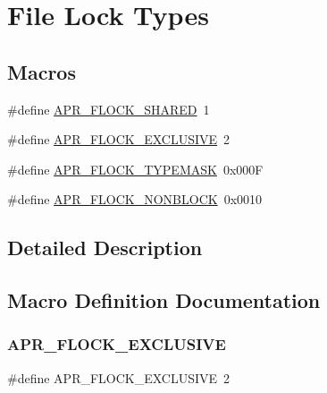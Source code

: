 \hypertarget{group__apr__file__lock__types}{}\section{File Lock Types}
\label{group__apr__file__lock__types}
\subsection*{Macros}
\begin{DoxyCompactItemize}
\item 
\#define \mbox{\hyperlink{group__apr__file__lock__types_gaba177fe81cd70b389753ad2096b2ce7c}{A\+P\+R\+\_\+\+F\+L\+O\+C\+K\+\_\+\+S\+H\+A\+R\+ED}}~1
\item 
\#define \mbox{\hyperlink{group__apr__file__lock__types_gafbf0caa093b99bdf11e25360b9099852}{A\+P\+R\+\_\+\+F\+L\+O\+C\+K\+\_\+\+E\+X\+C\+L\+U\+S\+I\+VE}}~2
\item 
\#define \mbox{\hyperlink{group__apr__file__lock__types_ga40777e364fb20bb9a9ee57e74b19c13d}{A\+P\+R\+\_\+\+F\+L\+O\+C\+K\+\_\+\+T\+Y\+P\+E\+M\+A\+SK}}~0x000F
\item 
\#define \mbox{\hyperlink{group__apr__file__lock__types_gab327fa0250e19006f20d5ec65fe7f22a}{A\+P\+R\+\_\+\+F\+L\+O\+C\+K\+\_\+\+N\+O\+N\+B\+L\+O\+CK}}~0x0010
\end{DoxyCompactItemize}


\subsection{Detailed Description}


\subsection{Macro Definition Documentation}
\mbox{\label{group__apr__file__lock__types_gafbf0caa093b99bdf11e25360b9099852}} 
\subsubsection{\texorpdfstring{A\+P\+R\+\_\+\+F\+L\+O\+C\+K\+\_\+\+E\+X\+C\+L\+U\+S\+I\+VE}{APR\_FLOCK\_EXCLUSIVE}}
{\footnotesize\ttfamily \#define A\+P\+R\+\_\+\+F\+L\+O\+C\+K\+\_\+\+E\+X\+C\+L\+U\+S\+I\+VE~2}

